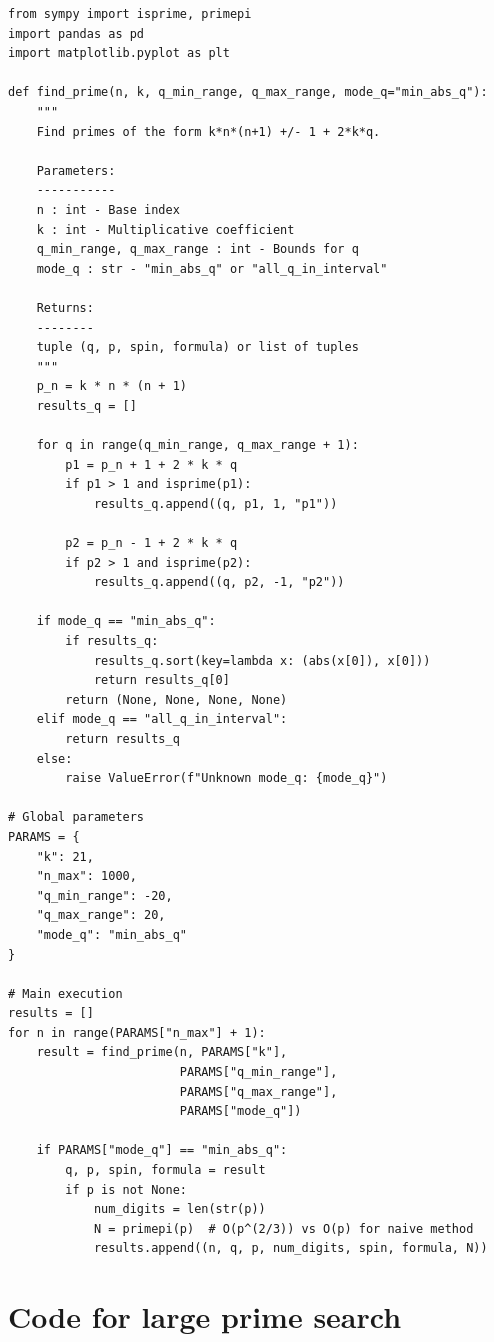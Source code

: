 \documentclass[11pt,a4paper]{article}
\theoremstyle{definition}
\theoremstyle{plain}
\begin{document}
\begin{lstlisting}[caption={Optimized implementation for prime search}]
from sympy import isprime, primepi
import pandas as pd
import matplotlib.pyplot as plt

def find_prime(n, k, q_min_range, q_max_range, mode_q="min_abs_q"):
    """
    Find primes of the form k*n*(n+1) +/- 1 + 2*k*q.
    
    Parameters:
    -----------
    n : int - Base index
    k : int - Multiplicative coefficient
    q_min_range, q_max_range : int - Bounds for q
    mode_q : str - "min_abs_q" or "all_q_in_interval"
    
    Returns:
    --------
    tuple (q, p, spin, formula) or list of tuples
    """
    p_n = k * n * (n + 1)
    results_q = []

    for q in range(q_min_range, q_max_range + 1):
        p1 = p_n + 1 + 2 * k * q
        if p1 > 1 and isprime(p1):
            results_q.append((q, p1, 1, "p1"))
        
        p2 = p_n - 1 + 2 * k * q
        if p2 > 1 and isprime(p2):
            results_q.append((q, p2, -1, "p2"))

    if mode_q == "min_abs_q":
        if results_q:
            results_q.sort(key=lambda x: (abs(x[0]), x[0]))
            return results_q[0]
        return (None, None, None, None)
    elif mode_q == "all_q_in_interval":
        return results_q
    else:
        raise ValueError(f"Unknown mode_q: {mode_q}")

# Global parameters
PARAMS = {
    "k": 21,
    "n_max": 1000,
    "q_min_range": -20,
    "q_max_range": 20,
    "mode_q": "min_abs_q"
}

# Main execution
results = []
for n in range(PARAMS["n_max"] + 1):
    result = find_prime(n, PARAMS["k"], 
                        PARAMS["q_min_range"], 
                        PARAMS["q_max_range"], 
                        PARAMS["mode_q"])
    
    if PARAMS["mode_q"] == "min_abs_q":
        q, p, spin, formula = result
        if p is not None:
            num_digits = len(str(p))
            N = primepi(p)  # O(p^(2/3)) vs O(p) for naive method
            results.append((n, q, p, num_digits, spin, formula, N))
\end{lstlisting}

\section{Code for large prime search}
\label{app:large_code}
\end{document}

